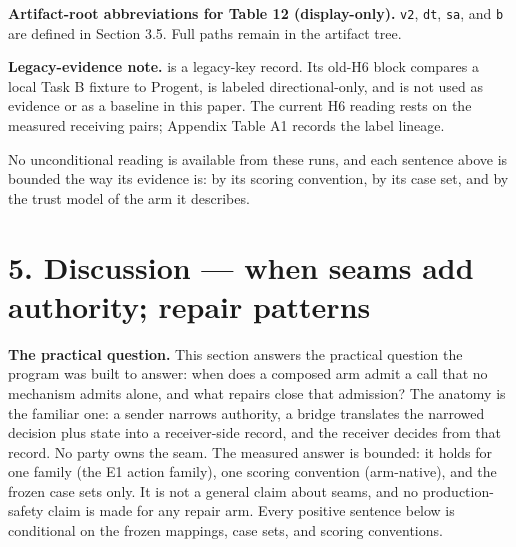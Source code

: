 \documentclass[
  10pt,
]{article}
\let\origtexttt\texttt
\renewcommand{\texttt}[1]{{\upshape\origtexttt{#1}}}
\renewcommand{\_}{\origunderscore\allowbreak}
\begin{document}
\textbf{Artifact-root abbreviations for Table 12 (display-only).}
\texttt{v2}, \texttt{dt}, \texttt{sa}, and \texttt{b} are defined in
Section 3.5. Full paths remain in the artifact tree.

\textbf{Legacy-evidence note.}
 is a legacy-key record. Its
old-H6 block compares a local Task B fixture to Progent, is labeled
directional-only, and is not used as evidence or as a baseline in this
paper. The current H6 reading rests on the measured receiving pairs;
Appendix Table A1 records the label lineage.

No unconditional reading is available from these runs, and each sentence
above is bounded the way its evidence is: by its scoring convention, by
its case set, and by the trust model of the arm it describes.

\section{5. Discussion --- when seams add authority; repair
patterns}\label{discussion-when-seams-add-authority-repair-patterns}

\textbf{The practical question.} This section answers the practical
question the program was built to answer: when does a composed arm admit
a call that no mechanism admits alone, and what repairs close that
admission? The anatomy is the familiar one: a sender narrows authority,
a bridge translates the narrowed decision plus state into a
receiver-side record, and the receiver decides from that record. No
party owns the seam. The measured answer is bounded: it holds for one
family (the E1 action family), one scoring convention (arm-native), and
the frozen case sets only. It is not a general claim about seams, and no
production-safety claim is made for any repair arm. Every positive
sentence below is conditional on the frozen mappings, case sets, and
scoring conventions.
\end{document}

